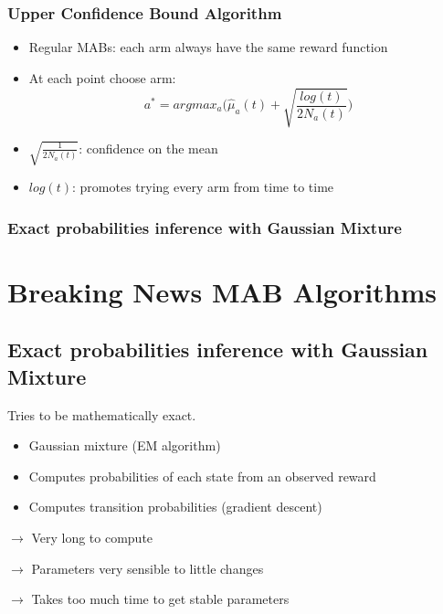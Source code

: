 \documentclass[french]{beamer}
\begin{document}
\begin{frame}
	\frametitle{Upper Confidence Bound Algorithm}

	\begin{itemize}
		\item Regular MABs: each arm always have the same reward function
		\item At each point choose arm:
		\begin{equation*}
		a^* = argmax_{a} \Big(\hat\mu_a(t) + \sqrt{\frac{log(t)}{2N_a(t)}}\Big)
		\end{equation*}
		\item $\sqrt{\frac{1}{2N_a(t)}}$: confidence on the mean
		\item $log(t)$: promotes trying every arm from time to time
	\end{itemize}


\end{frame}

\begin{frame}
	\frametitle{Exact probabilities inference with Gaussian Mixture}
	\section{Breaking News MAB Algorithms}
	\subsection{Exact probabilities inference with Gaussian Mixture}

	Tries to be mathematically exact.
	\begin{itemize}
		\item Gaussian mixture (EM algorithm)
		\item Computes probabilities of each state from an observed reward
		\item Computes transition probabilities (gradient descent)
	\newline
	\end{itemize}

	$\rightarrow$ Very long to compute

	$\rightarrow$ Parameters very sensible to little changes

	$\rightarrow$ Takes too much time to get stable parameters

\end{frame}
\end{document}
